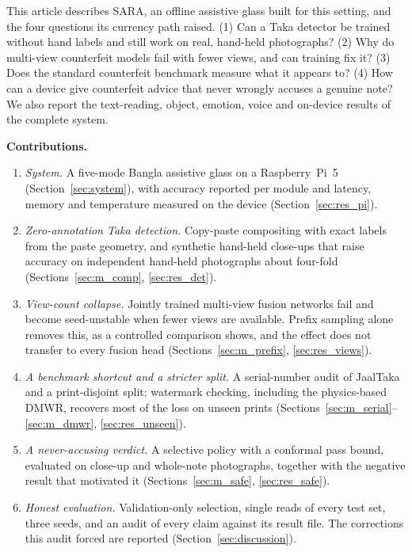 \documentclass[preprint,12pt]{elsarticle}
\begin{document}
This article describes SARA, an offline assistive glass built for this setting, and the four questions its currency path raised. (1) Can a Taka detector be trained without hand labels and still work on real, hand-held photographs? (2) Why do multi-view counterfeit models fail with fewer views, and can training fix it? (3) Does the standard counterfeit benchmark measure what it appears to? (4) How can a device give counterfeit advice that never wrongly accuses a genuine note? We also report the text-reading, object, emotion, voice and on-device results of the complete system.

\textbf{Contributions.}
\begin{enumerate}
\item \emph{System.} A five-mode Bangla assistive glass on a Raspberry~Pi~5 (Section~\ref{sec:system}), with accuracy reported per module and latency, memory and temperature measured on the device (Section~\ref{sec:res_pi}).
\item \emph{Zero-annotation Taka detection.} Copy-paste compositing with exact labels from the paste geometry, and synthetic hand-held close-ups that raise accuracy on independent hand-held photographs about four-fold (Sections~\ref{sec:m_comp}, \ref{sec:res_det}).
\item \emph{View-count collapse.} Jointly trained multi-view fusion networks fail and become seed-unstable when fewer views are available. Prefix sampling alone removes this, as a controlled comparison shows, and the effect does not transfer to every fusion head (Sections~\ref{sec:m_prefix}, \ref{sec:res_views}).
\item \emph{A benchmark shortcut and a stricter split.} A serial-number audit of JaalTaka and a print-disjoint split; watermark checking, including the physics-based DMWR, recovers most of the loss on unseen prints (Sections~\ref{sec:m_serial}--\ref{sec:m_dmwr}, \ref{sec:res_unseen}).
\item \emph{A never-accusing verdict.} A selective policy with a conformal pass bound, evaluated on close-up and whole-note photographs, together with the negative result that motivated it (Sections~\ref{sec:m_safe}, \ref{sec:res_safe}).
\item \emph{Honest evaluation.} Validation-only selection, single reads of every test set, three seeds, and an audit of every claim against its result file. The corrections this audit forced are reported (Section~\ref{sec:discussion}).
\end{enumerate}
\end{document}

